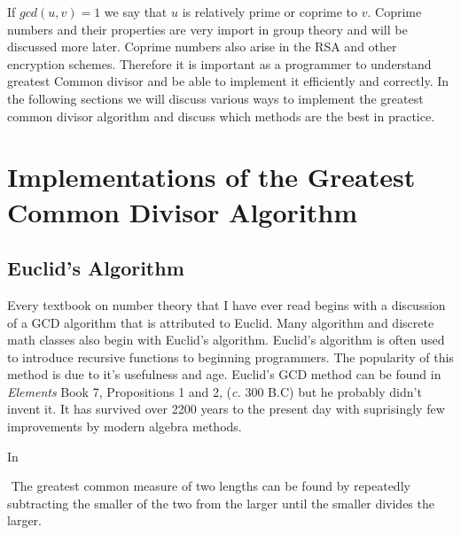 If $gcd(u, v) = 1$ we say that $u$ is relatively prime or coprime to $v$. Coprime numbers and their properties
are very import in group theory and will be discussed more later. Coprime numbers also arise in the RSA
and other encryption schemes. Therefore it is important as a programmer to understand greatest Common
divisor and be able to implement it efficiently and correctly. In the following sections we will discuss
various ways to implement the greatest common divisor algorithm and discuss which methods are the
best in practice.

\section{Implementations of the Greatest Common Divisor Algorithm}
\subsection{Euclid's Algorithm}
Every textbook on number theory that I have ever read begins with a discussion of a GCD algorithm that
is attributed to Euclid. Many algorithm and discrete math classes also begin with Euclid's algorithm.
Euclid's algorithm is often used to introduce recursive functions to beginning programmers. The popularity
of this method is due to it's usefulness and age. Euclid's GCD method can be found in \textit{Elements}
Book 7, Propositions 1 and 2, (\textit{c.} 300 B.C) but he probably didn't invent it. It has survived
over 2200 years to the present day with suprisingly few improvements by modern algebra methods.

In 

\begin{proposition}
$ $\newline
The greatest common measure of two lengths can be found by repeatedly subtracting
the smaller of the two from the larger until the smaller divides the larger.
\end{proposition}

